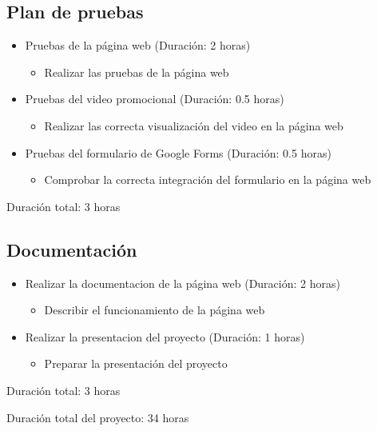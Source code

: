 \documentclass{report}
\begin{document}
            \subsection{Plan de pruebas}
                \begin{itemize}
                    \item Pruebas de la página web (Duración: 2 horas)
                    \begin{itemize}
                        \item Realizar las pruebas de la página web
                    \end{itemize}
                    \item Pruebas del video promocional (Duración: 0.5 horas)
                    \begin{itemize}
                        \item Realizar las correcta visualización del video en la página web
                    \end{itemize}
                    \item Pruebas del formulario de Google Forms (Duración: 0.5 horas)
                    \begin{itemize}
                        \item Comprobar la correcta integración del formulario en la página web
                    \end{itemize}
                \end{itemize}
                Duración total: 3 horas
            \subsection{Documentación}
                \begin{itemize}
                    \item Realizar la documentacion de la página web (Duración: 2 horas)
                    \begin{itemize}
                        \item Describir el funcionamiento de la página web
                    \end{itemize}
                    \item Realizar la presentacion del proyecto (Duración: 1 horas)
                    \begin{itemize}
                        \item Preparar la presentación del proyecto
                    \end{itemize}
                \end{itemize}
                Duración total: 3 horas
            \vfill
        \begin{center}
            Duración total del proyecto: 34 horas
        \end{center}
\end{document}

